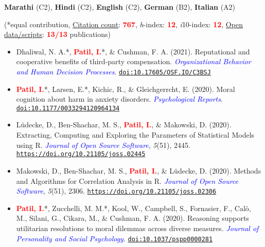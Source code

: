 \documentclass[10pt]{article}
\begin{document}
	\textbf{Marathi} (C2), \textbf{Hindi} (C2), \textbf{English} (C2), \textbf{German} (B2), \textbf{Italian} (A2)
	

	\begin{center}
	(*equal contribution, \href{https://scholar.google.it/citations?user=kSYuYTUAAAAJ&hl=en&oi=ao}{Citation count}: \textbf{\textcolor{red}{767}}, \textit{h}-index: \textbf{\textcolor{red}{12}}, \textit{i}10-index: \textbf{\textcolor{red}{12}}, \href{https://osf.io/hk5f3/}{Open data/scripts}: \textbf{\textcolor{red}{13/13}} publications)
	\end{center}
	
	\begin{itemize}
	\item Dhaliwal, N. A.*, \textbf{\textcolor{red}{Patil, I.}}*, \& Cushman, F. A. (2021). Reputational and cooperative benefits of third-party compensation. \textit{\textcolor{blue}{Organizational Behavior and Human Decision Processes}}. \href{https://psyarxiv.com/c3bsj/}{\tt doi:10.17605/OSF.IO/C3BSJ}
	
	\item  \textbf{\textcolor{red}{Patil, I.}}*, Larsen, E.*, Kichic, R., \& Gleichgerrcht, E. (2020). Moral cognition about harm in anxiety  disorders. \textit{\textcolor{blue}{Psychological Reports}}. \href{https://psyarxiv.com/g5p7v/}{\tt doi:10.1177/0033294120964134}
	
    \item Lüdecke, D., Ben-Shachar,  M. S., \textbf{\textcolor{red}{Patil, I.}}, \& Makowski, D. (2020). Extracting, Computing and Exploring the Parameters of Statistical Models using R. \textit{\textcolor{blue}{Journal of Open Source Software}}, \textit{5}(51), 2445. \href{https://joss.theoj.org/papers/10.21105/joss.02445}{\tt https://doi.org/10.21105/joss.02445}
	
    \item Makowski, D., Ben-Shachar,  M. S., \textbf{\textcolor{red}{Patil, I.}}, \& Lüdecke, D. (2020). Methods and Algorithms for Correlation Analysis in R. \textit{\textcolor{blue}{Journal of Open Source Software}}, \textit{5}(51), 2306. \href{https://joss.theoj.org/papers/10.21105/joss.02306}{\tt https://doi.org/10.21105/joss.02306}
	
	\item \textbf{\textcolor{red}{Patil, I.}}*, Zucchelli, M. M.*, Kool, W., Campbell, S., Fornasier, F., Cal\`{o}, M., Silani, G., Cikara, M., \& Cushman, F. A. (2020). Reasoning supports utilitarian resolutions to moral dilemmas across diverse measures. \textit{\textcolor{blue}{Journal of Personality and Social Psychology}}. \href{https://psyarxiv.com/q86vx/}{\tt doi:10.1037/pspp0000281}
	

\end{itemize}
\end{document}
